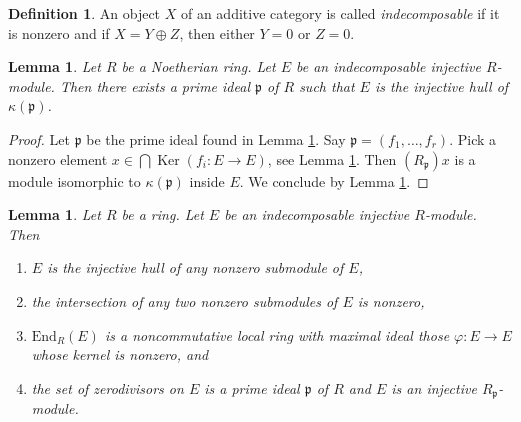 \documentclass{amsart}
\theoremstyle{plain}
\newtheorem{lemma}[subsection]{Lemma}
\theoremstyle{definition}
\newtheorem{definition}[subsection]{Definition}
\theoremstyle{remark}
\numberwithin{equation}{subsection}
\def\Ker{\mathop{\mathrm{Ker}}}
\begin{document}
\begin{definition}
\label{definition-indecomposable}
An object $X$ of an additive category is called {\it indecomposable}
if it is nonzero and if $X = Y \oplus Z$, then either $Y = 0$ or $Z = 0$.
\end{definition}

\begin{lemma}
\label{lemma-indecomposable-injective-noetherian}
Let $R$ be a Noetherian ring. Let $E$ be an indecomposable injective
$R$-module. Then there exists a prime ideal $\mathfrak p$ of $R$ such that
$E$ is the injective hull of $\kappa(\mathfrak p)$.
\end{lemma}

\begin{proof}
Let $\mathfrak p$ be the prime ideal found in
Lemma \ref{lemma-indecomposable-injective}.
Say $\mathfrak p = (f_1, \ldots, f_r)$.
Pick a nonzero element $x \in \bigcap \Ker(f_i : E \to E)$,
see Lemma \ref{lemma-indecomposable-injective}.
Then $(R_\mathfrak p)x$ is a module isomorphic to $\kappa(\mathfrak p)$
inside $E$. We conclude by Lemma \ref{lemma-indecomposable-injective}.
\end{proof}


\begin{lemma}
\label{lemma-indecomposable-injective}
Let $R$ be a ring. Let $E$ be an indecomposable injective $R$-module.
Then
\begin{enumerate}
\item $E$ is the injective hull of any nonzero submodule of $E$,
\item the intersection of any two nonzero submodules of $E$ is nonzero,
\item $\text{End}_R(E)$ is a noncommutative local ring with maximal
ideal those $\varphi : E \to E$ whose kernel is nonzero, and
\item the set of zerodivisors on $E$ is a prime ideal $\mathfrak p$ of $R$
and $E$ is an injective $R_\mathfrak p$-module.
\end{enumerate}
\end{lemma}
\end{document}
